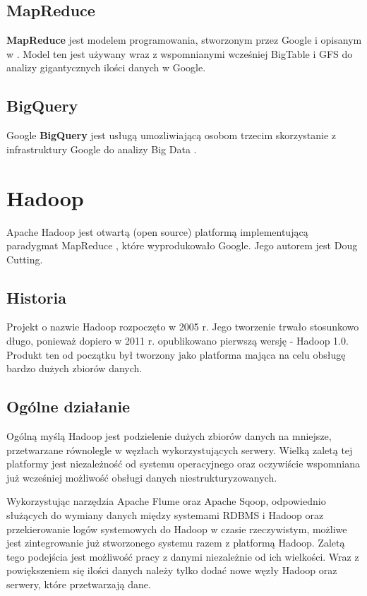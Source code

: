 \documentclass[twocolumn]{svjour3}          %
\begin{document}
\subsection{MapReduce}
\label{ssub:mapreduce}
\textbf{MapReduce} jest modelem programowania, stworzonym przez Google i opisanym w \cite{dean08}. Model ten jest używany wraz z wspomnianymi wcześniej BigTable i GFS do analizy gigantycznych ilości danych w Google.

\subsection{BigQuery}
\label{ssub:bigquery}
Google \textbf{BigQuery} jest usługą umozliwiającą osobom trzecim skorzystanie z infrastruktury Google do analizy Big Data \cite{www:google-big-query}.

\section{Hadoop}
\label{ssub:hadoop}
Apache Hadoop jest otwartą (open source) platformą implementującą paradygmat MapReduce \cite{dean08}, które wyprodukowało Google. Jego autorem jest Doug Cutting.

\subsection{Historia}
\label{ssub:hadoop_historia}
Projekt o nazwie Hadoop rozpoczęto w 2005 r. Jego tworzenie trwało stosunkowo długo, ponieważ dopiero  w 2011 r. opublikowano pierwszą wersję - Hadoop 1.0. Produkt ten od początku był tworzony jako platforma mająca na celu obsługę bardzo dużych zbiorów danych. 

\subsection{Ogólne działanie}
\label{ssub:ogolne_dzialanie}
Ogólną myślą Hadoop jest podzielenie dużych zbiorów danych na mniejsze, przetwarzane równolegle w węzłach wykorzystujących serwery. Wielką zaletą tej platformy jest niezależność od systemu operacyjnego oraz oczywiście wspomniana już wcześniej możliwość obsługi danych niestrukturyzowanych.

Wykorzystując narzędzia Apache Flume oraz Apache Sqoop, odpowiednio służących do wymiany danych między systemami RDBMS i Hadoop oraz przekierowanie logów systemowych do Hadoop w czasie rzeczywistym, możliwe jest zintegrowanie już stworzonego systemu razem z platformą Hadoop. Zaletą tego podejścia jest możliwość pracy z danymi niezależnie od ich wielkości. Wraz z powiększeniem się ilości danych należy tylko dodać nowe węzły Hadoop oraz serwery, które przetwarzają dane.
\end{document}
